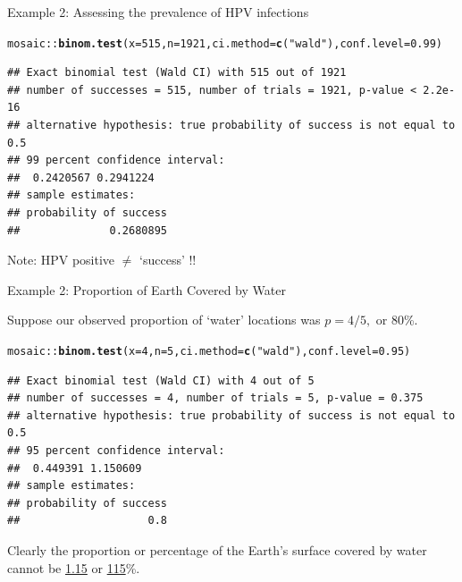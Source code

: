 \documentclass[10pt]{beamer}\usepackage[]{graphicx}\usepackage[]{color}
\makeatletter
\newcommand{\hlnum}[1]{\textcolor[rgb]{0.686,0.059,0.569}{#1}}%
\newcommand{\hlstr}[1]{\textcolor[rgb]{0.192,0.494,0.8}{#1}}%
\newcommand{\hlopt}[1]{\textcolor[rgb]{0,0,0}{#1}}%
\newcommand{\hlstd}[1]{\textcolor[rgb]{0.345,0.345,0.345}{#1}}%
\newcommand{\hlkwc}[1]{\textcolor[rgb]{0.333,0.667,0.333}{#1}}%
\newcommand{\hlkwd}[1]{\textcolor[rgb]{0.737,0.353,0.396}{\textbf{#1}}}%
\newenvironment{kframe}{%
 \def\at@end@of@kframe{}%
 \ifinner\ifhmode%
  \def\at@end@of@kframe{\end{minipage}}%
  \begin{minipage}{\columnwidth}%
 \fi\fi%
 \def\FrameCommand##1{\hskip\@totalleftmargin \hskip-\fboxsep
 \colorbox{shadecolor}{##1}\hskip-\fboxsep
     \hskip-\linewidth \hskip-\@totalleftmargin \hskip\columnwidth}%
 \MakeFramed {\advance\hsize-\width
   \@totalleftmargin\z@ \linewidth\hsize
   \@setminipage}}%
 {\par\unskip\endMakeFramed%
 \at@end@of@kframe}
\newenvironment{knitrout}{}{} %
\makeatother
\begin{document}
\begin{frame}[fragile]{Example 2: Assessing the prevalence of HPV infections}
	
\begin{knitrout}\tiny
{}\color{fgcolor}\begin{kframe}
\begin{alltt}
\hlstd{mosaic}\hlopt{::}\hlkwd{binom.test}\hlstd{(}\hlkwc{x} \hlstd{=} \hlnum{515}\hlstd{,} \hlkwc{n} \hlstd{=} \hlnum{1921}\hlstd{,} \hlkwc{ci.method}\hlstd{=}\hlkwd{c}\hlstd{(}\hlstr{"wald"}\hlstd{),} \hlkwc{conf.level}\hlstd{=}\hlnum{0.99}\hlstd{)}
\end{alltt}
\begin{verbatim}
## Exact binomial test (Wald CI) with 515 out of 1921 
## number of successes = 515, number of trials = 1921, p-value < 2.2e-16
## alternative hypothesis: true probability of success is not equal to 0.5 
## 99 percent confidence interval:
##  0.2420567 0.2941224 
## sample estimates:
## probability of success 
##              0.2680895
\end{verbatim}
\end{kframe}
\end{knitrout}
	Note: HPV positive $\ne$ `success' !!
\end{frame}



\begin{frame}[fragile]{Example 2: Proportion of Earth Covered by Water}
	
	Suppose our observed proportion of `water' locations was $p = 4/5,$ or 80\%.
	
\begin{knitrout}\tiny
{}\color{fgcolor}\begin{kframe}
\begin{alltt}
\hlstd{mosaic}\hlopt{::}\hlkwd{binom.test}\hlstd{(}\hlkwc{x} \hlstd{=} \hlnum{4}\hlstd{,} \hlkwc{n} \hlstd{=} \hlnum{5}\hlstd{,} \hlkwc{ci.method}\hlstd{=}\hlkwd{c}\hlstd{(}\hlstr{"wald"}\hlstd{),} \hlkwc{conf.level}\hlstd{=}\hlnum{0.95}\hlstd{)}
\end{alltt}
\begin{verbatim}
## Exact binomial test (Wald CI) with 4 out of 5 
## number of successes = 4, number of trials = 5, p-value = 0.375
## alternative hypothesis: true probability of success is not equal to 0.5 
## 95 percent confidence interval:
##  0.449391 1.150609 
## sample estimates:
## probability of success 
##                    0.8
\end{verbatim}
\end{kframe}
\end{knitrout}
	
	\pause 
	
	Clearly  the proportion or percentage of the Earth's surface covered by water cannot
	be \underline{1.15} or \underline{115}\%.  
	
\end{frame}
\end{document}
